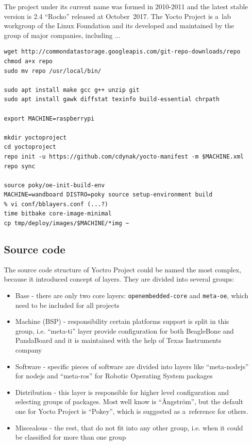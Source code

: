 \documentclass[printmode]{mgr}
\begin{document}
The project under its current name was formed in 2010-2011 and the latest stable version is 2.4 ``Rocko'' released at October~2017. The Yocto Project is a~lab workgroup of the Linux Foundation and its developed and maintained by the group of major companies, including ...







\begin{lstlisting}
wget http://commondatastorage.googleapis.com/git-repo-downloads/repo
chmod a+x repo
sudo mv repo /usr/local/bin/

sudo apt install make gcc g++ unzip git
sudo apt install gawk diffstat texinfo build-essential chrpath

export MACHINE=raspberrypi

mkdir yoctoproject
cd yoctoproject
repo init -u https://github.com/cdynak/yocto-manifest -m $MACHINE.xml
repo sync

source poky/oe-init-build-env
MACHINE=wandboard DISTRO=poky source setup-environment build
% vi conf/bblayers.conf (...?)
time bitbake core-image-minimal
cp tmp/deploy/images/$MACHINE/*img ~
\end{lstlisting}


\subsection*{Source code}

The source code structure of Yoctro Project could be named the most complex, because it introduced concept of layers.
They are divided into several groups:
\begin{itemize}
    \item Base - there are only two core layers: \verb|openembedded-core| and \verb|meta-oe|, which need to be included for all projects
    \item Machine (BSP) - responsibility certain platforms support is split in this group, i.e. ``meta-ti'' layer provide configuration for both BeagleBone and PandaBoard and it is maintained with the help of Texas Instruments company
    \item Software - specific pieces of software are divided into layers like ``meta-nodejs'' for nodejs and ``meta-ros'' for Robotic Operating System packages
    \item Distribution - this layer is responsible for higher level configuration and selecting groups of packages. Most well know is ``Ångström'', but the default one for Yocto Project is ``Pokey'', which is suggested as a~reference for others.
    \item Miscealous - the rest, that do not fit into any other group, i.e. when it could be classified for more than one group
\end{itemize}
\end{document}

